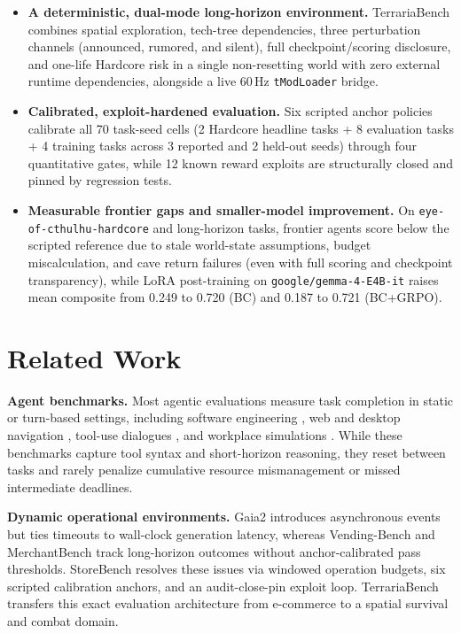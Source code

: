 \documentclass[10pt,letterpaper]{article}
\begin{document}
\begin{itemize}[leftmargin=18pt,itemsep=3pt]
  \item \textbf{A deterministic, dual-mode long-horizon environment.} TerrariaBench combines spatial exploration, tech-tree dependencies, three perturbation channels (announced, rumored, and silent), full checkpoint/scoring disclosure, and one-life Hardcore risk in a single non-resetting world with zero external runtime dependencies, alongside a live 60\,Hz \texttt{tModLoader} bridge.
  \item \textbf{Calibrated, exploit-hardened evaluation.} Six scripted anchor policies calibrate all 70 task-seed cells (2 Hardcore headline tasks + 8 evaluation tasks + 4 training tasks across 3 reported and 2 held-out seeds) through four quantitative gates, while 12 known reward exploits are structurally closed and pinned by regression tests.
  \item \textbf{Measurable frontier gaps and smaller-model improvement.} On \texttt{eye-of-cthulhu-hardcore} and long-horizon tasks, frontier agents score below the scripted reference due to stale world-state assumptions, budget miscalculation, and cave return failures (even with full scoring and checkpoint transparency), while LoRA post-training on \texttt{google/gemma-4-E4B-it} raises mean composite from 0.249 to 0.720 (BC) and 0.187 to 0.721 (BC+GRPO).
\end{itemize}

\section{Related Work}

\textbf{Agent benchmarks.} Most agentic evaluations measure task completion in static or turn-based settings, including software engineering \citep{jimenez2024swebench}, web and desktop navigation \citep{zhou2024webarena,xie2024osworld}, tool-use dialogues \citep{yao2025taubench}, and workplace simulations \citep{xu2025theagentcompany}. While these benchmarks capture tool syntax and short-horizon reasoning, they reset between tasks and rarely penalize cumulative resource mismanagement or missed intermediate deadlines.

\textbf{Dynamic operational environments.} Gaia2 \citep{froger2026gaia2} introduces asynchronous events but ties timeouts to wall-clock generation latency, whereas Vending-Bench \citep{backlund2025vendingbench} and MerchantBench \citep{shi2026merchantbench} track long-horizon outcomes without anchor-calibrated pass thresholds. StoreBench \citep{raghuvanshi2026storebench} resolves these issues via windowed operation budgets, six scripted calibration anchors, and an audit-close-pin exploit loop. TerrariaBench transfers this exact evaluation architecture from e-commerce to a spatial survival and combat domain.
\end{document}
